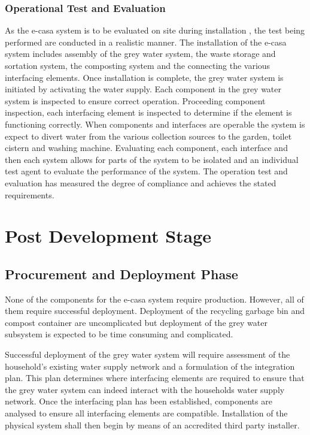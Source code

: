 \documentclass[a4paper,11pt,fleqn]{report}
\begin{document}
\subsection{Operational Test and Evaluation}
As the e-casa system is to be evaluated on site during installation , the test being performed are conducted in a realistic manner. The installation of the e-casa system includes assembly of the grey water system, the waste storage and sortation system, the composting system and the connecting the various interfacing elements. Once installation is complete, the grey water system is initiated by activating the water supply. Each component in the grey water system is inspected to ensure correct operation. Proceeding component inspection, each interfacing element is inspected to determine if the element is functioning correctly. When components and interfaces are operable the system is expect to divert water from the various collection sources to the garden, toilet cistern and washing machine. Evaluating each component, each interface and then each system allows for parts of the system to be isolated and an individual test agent to evaluate the performance of the system. The operation test and evaluation has measured the degree of compliance and achieves the stated requirements.

\chapter{Post Development Stage}

\section{Procurement and Deployment Phase}
None of the components for the \ac{e-casa} system require production. However, all of them require successful deployment. Deployment of the recycling garbage bin and compost container are uncomplicated but deployment of the grey water subsystem is expected to be time consuming and complicated.

Successful deployment of the grey water system will require assessment of the household's existing water supply network and a formulation of the integration plan. This plan determines where interfacing elements are required to ensure that the grey water system can indeed interact with the households water supply network. Once the interfacing plan has been established, components are analysed to ensure all interfacing elements are compatible. Installation of the physical system shall then begin by means of an accredited third party installer. 
\end{document}
